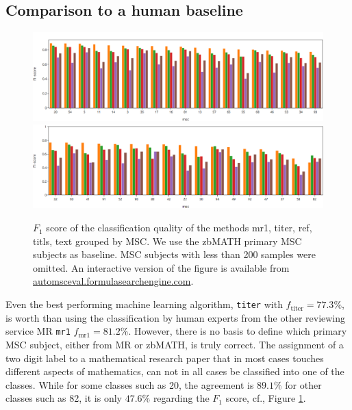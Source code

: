 \subsection{Comparison to a human baseline}
\begin{figure}[ht]
  \centering
  \includegraphics[width=1.1\textwidth]{overview1.png}
  \includegraphics[width=1.1\textwidth]{overview2.png}
  \caption{$F_1$ score of the classification quality of the methods mr1, titer, ref, titls, text grouped by MSC. We use the zbMATH primary MSC subjects as baseline. MSC subjects with less than 200 samples were omitted. An interactive version of the figure is available from \url{automsceval.formulasearchengine.com}.}\label{fgHum}
\end{figure}
Even the best performing machine learning algorithm, \texttt{titer} with $f_\mathrm{titer}=77.3\%$, is worth than using the classification by human experts from the other reviewing service MR \texttt{mr1} $f_\mathrm{mr1}=81.2\%.$ 
However, there is no basis to define which primary MSC subject, either from MR or zbMATH, is truly correct.
The assignment of a two digit label to a mathematical research paper that in most cases touches different aspects of mathematics, can not in all cases be classified into one of the classes.
While for some classes such as 20, the agreement is $89.1\%$ for other classes such as 82, it is only $47.6\%$ regarding the $F_1$ score, cf., Figure \ref{fgHum}.

